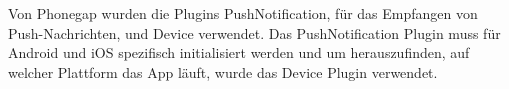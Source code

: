 Von Phonegap wurden die Plugins PushNotification, für das Empfangen von Push-Nachrichten, und Device verwendet. Das PushNotification Plugin muss für Android und iOS spezifisch initialisiert werden und um herauszufinden, auf welcher Plattform das App läuft, wurde das Device Plugin verwendet. \\



